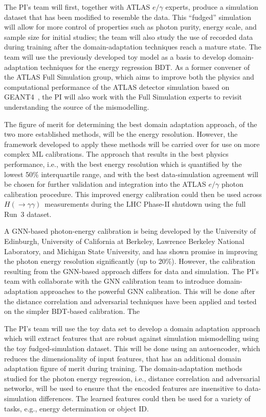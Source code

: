 \documentclass[letter, USenglish, 11pt, subfigure]{article}
\newcommand{\hyy}{\ensuremath{H(\to\gamma\gamma)}}
\begin{document}
The PI's team will first, together with ATLAS $e/\gamma$ experts, produce a simulation dataset that has been modified to resemble the data. This ``fudged'' simulation will allow for more control of properties such as photon purity, energy scale, and sample size for initial studies; the team will also study the use of recorded data during training after the domain-adaptation techniques reach a mature state. The team will use the previously developed toy model as a basis to develop domain-adaptation techniques for the energy regression BDT. As a former convener of the ATLAS Full Simulation group, which aims to improve both the physics and computational performance of the ATLAS detector simulation based on GEANT4~\cite{Agostinelli:2002hh}, the PI will also work with the Full Simulation experts to revisit understanding the source of the mismodelling.

The figure of merit for determining the best domain adaptation approach, of the two more established methods, will be the energy resolution. However, the framework developed to apply these methods will be carried over for use on more complex ML calibrations. The approach that results in the best physics performance, i.e., with the best energy resolution which is quantified by the lowest 50\% interquartile range, and with the best data-simulation agreement will be chosen for further validation and integration into the ATLAS $e/\gamma$ photon calibration procedure. This improved energy calibration could then be used across \hyy\  measurements during the LHC Phase-II shutdown using the full Run~3 dataset.

A GNN-based photon-energy calibration is being developed by the University of Edinburgh, University of California at Berkeley, Lawrence Berkeley National Laboratory, and Michigan State University, and has shown promise in improving the photon energy resolution significantly (up to 20\%). However, the calibration resulting from the GNN-based approach differs for data and simulation. The PI's team with collaborate with the GNN calibration team to introduce domain-adaptation approaches to the powerful GNN calibration. This will be done after the distance correlation and adversarial techniques have been applied and tested on the simpler BDT-based calibration. The 

The PI's team will use the toy data set to develop a domain adaptation approach which will extract features that are robust against simulation mismodelling using the toy fudged-simulation dataset. This will be done using an autoencoder, which reduces the dimensionality of input features, that has an additional domain adaptation figure of merit during training. The domain-adaptation methods studied for the photon energy regression, i.e., distance correlation and adversarial networks, will be used to ensure that the encoded features are insensitive to data-simulation differences. The learned features could then be used for a variety of tasks, e.g., energy determination or object ID.
\end{document}

